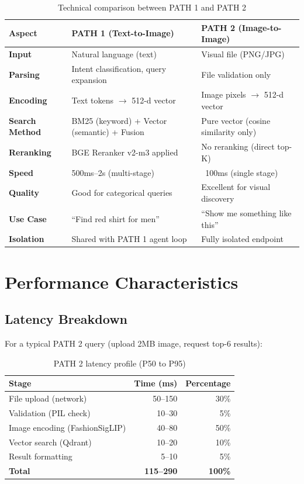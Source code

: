 \documentclass[12pt, twoside]{report}
\begin{document}
\begin{table}[H]
\centering
\begin{tabular}{p{2cm}p{3.5cm}p{3.5cm}}
\toprule
\textbf{Aspect} & \textbf{PATH 1 (Text-to-Image)} & \textbf{PATH 2 (Image-to-Image)}\\
\midrule
\textbf{Input} & Natural language (text) & Visual file (PNG/JPG) \\
\textbf{Parsing} & Intent classification, query expansion & File validation only \\
\textbf{Encoding} & Text tokens $\rightarrow$ 512-d vector & Image pixels $\rightarrow$ 512-d vector \\
\textbf{Search Method} & BM25 (keyword) + Vector (semantic) + Fusion & Pure vector (cosine similarity only) \\
\textbf{Reranking} & BGE Reranker v2-m3 applied & No reranking (direct top-K) \\
\textbf{Speed} & 500ms--2s (multi-stage) & ~100ms (single stage) \\
\textbf{Quality} & Good for categorical queries & Excellent for visual discovery \\
\textbf{Use Case} & ``Find red shirt for men'' & ``Show me something like this'' \\
\textbf{Isolation} & Shared with PATH 1 agent loop & Fully isolated endpoint \\
\bottomrule
\end{tabular}
\caption{Technical comparison between PATH 1 and PATH 2}
\label{tab:path_comparison}
\end{table}

\section{Performance Characteristics}

\subsection{Latency Breakdown}

For a typical PATH 2 query (upload 2MB image, request top-6 results):

\begin{table}[H]
\centering
\begin{tabular}{lrr}
\toprule
\textbf{Stage} & \textbf{Time (ms)} & \textbf{Percentage}\\
\midrule
File upload (network) & 50--150 & 30\% \\
Validation (PIL check) & 10--30 & 5\% \\
Image encoding (FashionSigLIP) & 40--80 & 50\% \\
Vector search (Qdrant) & 10--20 & 10\% \\
Result formatting & 5--10 & 5\% \\
\midrule
\textbf{Total} & \textbf{115--290} & \textbf{100\%} \\
\bottomrule
\end{tabular}
\caption{PATH 2 latency profile (P50 to P95)}
\label{tab:path2_latency}
\end{table}
\end{document}

